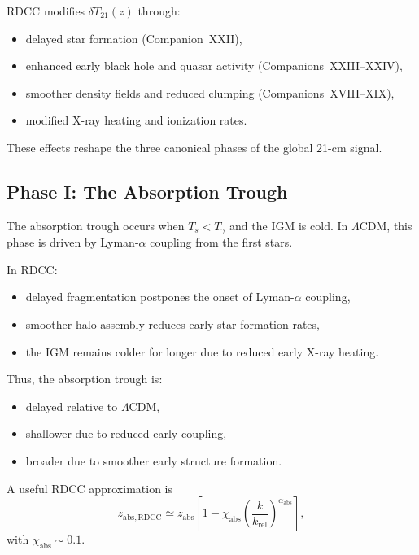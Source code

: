 \documentclass[11pt,a4paper]{article}
\begin{document}
RDCC modifies $\delta T_{21}(z)$ through:
\begin{itemize}
\item delayed star formation (Companion~XXII),
\item enhanced early black hole and quasar activity (Companions~XXIII–XXIV),
\item smoother density fields and reduced clumping (Companions~XVIII–XIX),
\item modified X-ray heating and ionization rates.
\end{itemize}

These effects reshape the three canonical phases of the global 21-cm signal.

\subsection{Phase I: The Absorption Trough}

The absorption trough occurs when $T_{s} < T_{\gamma}$ and the IGM is cold. In $\Lambda$CDM,
this phase is driven by Lyman-$\alpha$ coupling from the first stars.

In RDCC:
\begin{itemize}
\item delayed fragmentation postpones the onset of Lyman-$\alpha$ coupling,
\item smoother halo assembly reduces early star formation rates,
\item the IGM remains colder for longer due to reduced early X-ray heating.
\end{itemize}

Thus, the absorption trough is:
\begin{itemize}
\item delayed relative to $\Lambda$CDM,
\item shallower due to reduced early coupling,
\item broader due to smoother early structure formation.
\end{itemize}

A useful RDCC approximation is
\begin{equation}
z_{\mathrm{abs,RDCC}}
\simeq
z_{\mathrm{abs}}
\left[
1
-
\chi_{\mathrm{abs}}
\left(
\frac{k}{k_{\mathrm{rel}}}
\right)^{\alpha_{\mathrm{abs}}}
\right],
\end{equation}
with $\chi_{\mathrm{abs}} \sim 0.1$.

\end{document}
